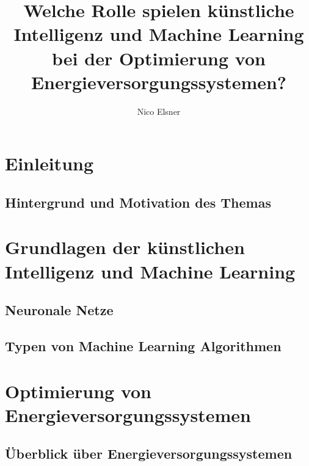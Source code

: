 \documentclass[conference]{IEEEtran}
\title{Welche Rolle spielen künstliche Intelligenz und Machine Learning bei der Optimierung von Energieversorgungssystemen?}
\author{{\Large Nico Elsner}}
\begin{document}

	\maketitle

	\begin{abstract}
		
	\end{abstract}
	\section{Einleitung}
	\subsection{Hintergrund und Motivation des Themas}
	


	\section{Grundlagen der künstlichen Intelligenz und Machine Learning}
	
	\subsection{Neuronale Netze}
	
	\subsection{Typen von Machine Learning Algorithmen}
	

	\section{Optimierung von Energieversorgungssystemen}
	
	\subsection{Überblick über Energieversorgungssystemen}
	
\end{document}
